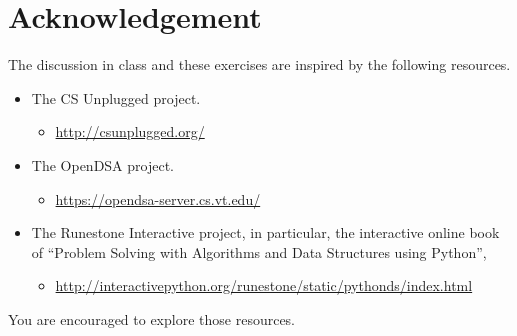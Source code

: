 \documentclass[11pt,letterpaper]{article}
\begin{document}
\section{Acknowledgement}

The discussion in class and these exercises are inspired by the following
resources. 

\begin{itemize}

    \item The CS Unplugged project.
        \begin{itemize}
            \item \url{http://csunplugged.org/}
        \end{itemize}

    \item The OpenDSA project.
        \begin{itemize}
            \item \url{https://opendsa-server.cs.vt.edu/}
        \end{itemize}

    \item The Runestone Interactive project, in particular, the interactive
        online book of ``Problem Solving with Algorithms and Data Structures
        using Python'',

        \begin{itemize}
            \item \url{http://interactivepython.org/runestone/static/pythonds/index.html}
        \end{itemize}

\end{itemize}
You are encouraged to explore those resources. 
\end{document}
